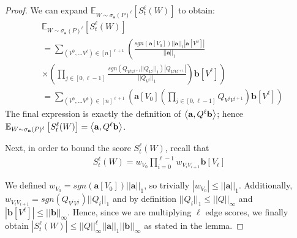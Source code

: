 \begin{proof}
We can expand $\mathbb{E}_{W \sim \sigma_{\mathbf{a}}(P)^{\ell}} \left[S_{t}^{\ell}(W)\right]$ to obtain:
\small
\begin{align*}
&\mathbb{E}_{W \sim \sigma_{\mathbf{a}}(P)^{\ell}} \left[S_{t}^{\ell}(W)\right] \\ 
&= \sum_{(V^0, ... V^{\ell}) \in [n]^{\ell+1}} \left(\frac{sgn(\mathbf{a}[V_0])||\mathbf{a}||_1|\mathbf{a}[V^0]|}{||\mathbf{a}||_1} \right. \\
&\left. \times \left( \prod_{j \in [0, \ell-1]} \frac{sgn(Q_{V^jV^{j+1}}||Q_{V^j}||_1)|Q_{V^jV^{j+1}}|}{||Q_{V^j}||_1} \right) \mathbf{b}[V^{\ell}] \right) \\
& = \sum_{(V^0, ... V^{k}) \in [n]^{\ell+1}} \left(\mathbf{a}[V_0] \left( \prod_{j \in [0,\ell-1]} Q_{V^jV^{j+1}}\right) \mathbf{b}[V^{\ell}] \right)
\end{align*}
\normalsize
The final expression is exactly the definition of $\left< \mathbf{a}, Q^{\ell}\mathbf{b} \right>$; hence $\mathbb{E}_{W \sim \sigma_{\mathbf{a}}(P)^{\ell}} \left[S_{t}^{\ell}(W)\right] = \left< \mathbf{a}, Q^{\ell}\mathbf{b} \right>$.


Next, in order to bound the score $S_{t}^{\ell}(W)$, recall that
\begin{align*}
S_{t}^{\ell}(W) = w_{V_0}\prod_{i=0}^{\ell-1}w_{V_iV_{i+1}}\mathbf{b}[V_{\ell}]
\end{align*}

We defined $w_{V_0} = sgn(\mathbf{a}[V_0])||\mathbf{a}||_1$, so trivially $|w_{V_0}| \leq ||\mathbf{a}||_1$.
Additionally, $w_{V_iV_{i+1}} = sgn(Q_{V^iV^j})||Q_i||_1 $ and by definition $||Q_i||_1  \leq ||Q||_{\infty}$ and $| \mathbf{b}[V^{\ell}] |\leq ||\mathbf{b}||_\infty$.
Hence, since we are multiplying ${\ell}$ edge scores, we finally obtain
$|S_{t}^{\ell}(W)| \leq ||Q||_{\infty}^{\ell}||\mathbf{a}||_1||\mathbf{b}||_\infty$ as stated in the lemma.
\end{proof}


